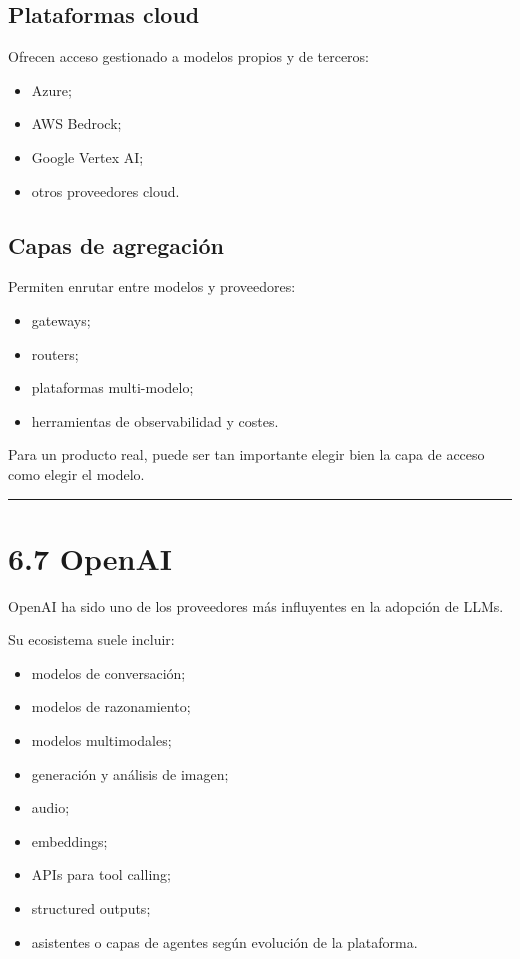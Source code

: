 \subsection{Plataformas cloud}\label{plataformas-cloud}

Ofrecen acceso gestionado a modelos propios y de terceros:

\begin{itemize}
\tightlist
\item
  Azure;
\item
  AWS Bedrock;
\item
  Google Vertex AI;
\item
  otros proveedores cloud.
\end{itemize}

\subsection{Capas de agregación}\label{capas-de-agregaciuxf3n}

Permiten enrutar entre modelos y proveedores:

\begin{itemize}
\tightlist
\item
  gateways;
\item
  routers;
\item
  plataformas multi-modelo;
\item
  herramientas de observabilidad y costes.
\end{itemize}

Para un producto real, puede ser tan importante elegir bien la capa de
acceso como elegir el modelo.

\begin{center}\rule{0.5\linewidth}{0.5pt}\end{center}

\section{6.7 OpenAI}\label{openai}

OpenAI ha sido uno de los proveedores más influyentes en la adopción de
LLMs.

Su ecosistema suele incluir:

\begin{itemize}
\tightlist
\item
  modelos de conversación;
\item
  modelos de razonamiento;
\item
  modelos multimodales;
\item
  generación y análisis de imagen;
\item
  audio;
\item
  embeddings;
\item
  APIs para tool calling;
\item
  structured outputs;
\item
  asistentes o capas de agentes según evolución de la plataforma.
\end{itemize}

